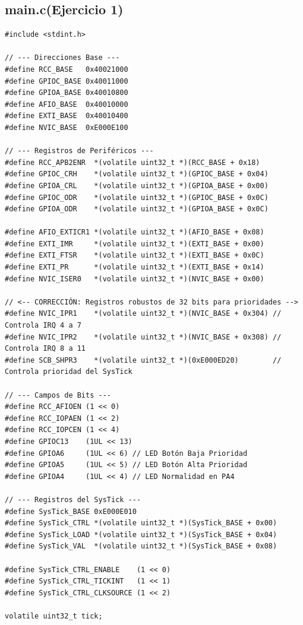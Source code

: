
\subsection{main.c(Ejercicio 1)}
\begin{lstlisting}[caption={Configuración inicial en main.c}, label={cod:main}]
#include <stdint.h>

// --- Direcciones Base ---
#define RCC_BASE   0x40021000
#define GPIOC_BASE 0x40011000
#define GPIOA_BASE 0x40010800
#define AFIO_BASE  0x40010000
#define EXTI_BASE  0x40010400
#define NVIC_BASE  0xE000E100

// --- Registros de Periféricos ---
#define RCC_APB2ENR  *(volatile uint32_t *)(RCC_BASE + 0x18)
#define GPIOC_CRH    *(volatile uint32_t *)(GPIOC_BASE + 0x04)
#define GPIOA_CRL    *(volatile uint32_t *)(GPIOA_BASE + 0x00)
#define GPIOC_ODR    *(volatile uint32_t *)(GPIOC_BASE + 0x0C)
#define GPIOA_ODR    *(volatile uint32_t *)(GPIOA_BASE + 0x0C)

#define AFIO_EXTICR1 *(volatile uint32_t *)(AFIO_BASE + 0x08)
#define EXTI_IMR     *(volatile uint32_t *)(EXTI_BASE + 0x00)
#define EXTI_FTSR    *(volatile uint32_t *)(EXTI_BASE + 0x0C)
#define EXTI_PR      *(volatile uint32_t *)(EXTI_BASE + 0x14)
#define NVIC_ISER0   *(volatile uint32_t *)(NVIC_BASE + 0x00)

// <-- CORRECCIÓN: Registros robustos de 32 bits para prioridades -->
#define NVIC_IPR1    *(volatile uint32_t *)(NVIC_BASE + 0x304) // Controla IRQ 4 a 7
#define NVIC_IPR2    *(volatile uint32_t *)(NVIC_BASE + 0x308) // Controla IRQ 8 a 11
#define SCB_SHPR3    *(volatile uint32_t *)(0xE000ED20)        // Controla prioridad del SysTick

// --- Campos de Bits ---
#define RCC_AFIOEN (1 << 0)
#define RCC_IOPAEN (1 << 2)
#define RCC_IOPCEN (1 << 4)
#define GPIOC13    (1UL << 13)
#define GPIOA6     (1UL << 6) // LED Botón Baja Prioridad
#define GPIOA5     (1UL << 5) // LED Botón Alta Prioridad
#define GPIOA4     (1UL << 4) // LED Normalidad en PA4

// --- Registros del SysTick ---
#define SysTick_BASE 0xE000E010
#define SysTick_CTRL *(volatile uint32_t *)(SysTick_BASE + 0x00)
#define SysTick_LOAD *(volatile uint32_t *)(SysTick_BASE + 0x04)
#define SysTick_VAL  *(volatile uint32_t *)(SysTick_BASE + 0x08)

#define SysTick_CTRL_ENABLE    (1 << 0)
#define SysTick_CTRL_TICKINT   (1 << 1)
#define SysTick_CTRL_CLKSOURCE (1 << 2)

volatile uint32_t tick;


\end{lstlisting}

